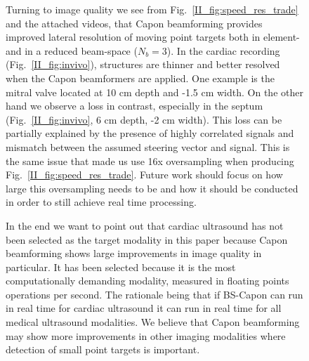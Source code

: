 \begin{figure}[!t]
Turning to image quality we see from Fig.\ \ref{II_fig:speed_res_trade} and the attached videos, that Capon beamforming provides improved lateral resolution of moving point targets both in element- and in a reduced beam-space ($N_b=3$). In the cardiac recording (Fig.\ \ref{II_fig:invivo}), structures are thinner and better resolved when the Capon beamformers are applied. One example is the mitral valve located at 10 cm depth and -1.5 cm width. On the other hand we observe a loss in contrast, especially in the septum (Fig.\ \ref{II_fig:invivo}, 6 cm depth, -2 cm width). This loss can be partially explained by the presence of highly correlated signals and mismatch between the assumed steering vector and signal. This is the same issue that made us use 16x oversampling when producing Fig.\ \ref{II_fig:speed_res_trade}. Future work should focus on how large this oversampling needs to be and how it should be conducted in order to still achieve real time processing.

In the end we want to point out that cardiac ultrasound has not been selected as the target modality in this paper because Capon beamforming shows large improvements in image quality in particular. It has been selected because it is the most computationally demanding modality, measured in floating points operations per second. The rationale being that if BS-Capon can run in real time for cardiac ultrasound it can run in real time for all medical ultrasound modalities. We believe that Capon beamforming may show more improvements in other imaging modalities where detection of small point targets is important.





\end{figure}
